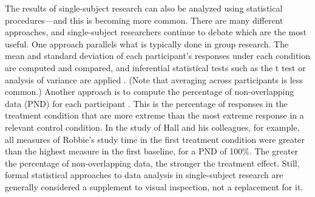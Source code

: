  The results of single-subject research can also be analyzed using statistical procedures---and this is becoming more common. There are many different approaches, and single-subject researchers continue to debate which are the most useful. One approach parallels what is typically done in group research. The mean and standard deviation of each participant's responses under each condition are computed and compared, and inferential statistical tests such as the t test or analysis of variance are applied \citep{fisch_evaluating_2001}. (Note that averaging across participants is less common.) Another approach is to compute the percentage of non-overlapping data (PND) for each participant \citep{scruggs_how_2001}. This is the percentage of responses in the treatment condition that are more extreme than the most extreme response in a relevant control condition. In the study of Hall and his colleagues, for example, all measures of Robbie's study time in the first treatment condition were greater than the highest measure in the first baseline, for a PND of 100\%. The greater the percentage of non-overlapping data, the stronger the treatment effect. Still, formal statistical approaches to data analysis in single-subject research are generally considered a supplement to visual inspection, not a replacement for it.
 
 
\subsection{}
 
